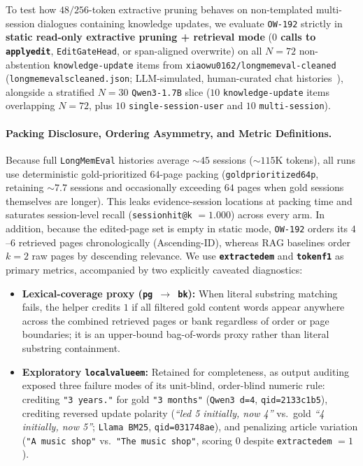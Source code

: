 \documentclass[11pt]{article}
\renewcommand{\_}{\origunderscore\allowbreak}
\begin{document}
To test how $48/256$-token extractive pruning behaves on non-templated multi-session dialogues containing knowledge updates, we evaluate \texttt{OW-192} strictly in \textbf{static read-only extractive pruning + retrieval mode} (\textbf{$0$ calls to \texttt{apply\_edit}}, \texttt{EditGateHead}, or span-aligned overwrite) on all $N=72$ non-abstention \texttt{knowledge-update} items from \texttt{xiaowu0162/\allowbreak longmemeval-cleaned} (\texttt{longmemeval\_s\_cleaned.json}; LLM-simulated, human-curated chat histories~\cite{wu2025longmemeval}), alongside a stratified $N=30$ \texttt{Qwen3-1.7B} slice ($10$ \texttt{knowledge-update} items overlapping $N=72$, plus $10$ \texttt{single-session-user} and $10$ \texttt{multi-session}).

\paragraph{Packing Disclosure, Ordering Asymmetry, and Metric Definitions.}
Because full \texttt{LongMemEval} histories average $\sim 45$ sessions ($\sim 115\text{K}$ tokens), all runs use deterministic gold-prioritized $64$-page packing (\texttt{gold\_prioritized\_64p}, retaining $\sim 7.7$ sessions and occasionally exceeding $64$ pages when gold sessions themselves are longer). This leaks evidence-session locations at packing time and saturates session-level recall (\texttt{session\_hit@k} $=1.000$) across every arm. In addition, because the edited-page set is empty in static mode, \texttt{OW-192} orders its $4$--$6$ retrieved pages chronologically (Ascending-ID), whereas RAG baselines order $k=2$ raw pages by descending relevance. We use \textbf{\texttt{extracted\_em}} and \textbf{\texttt{token\_f1}} as primary metrics, accompanied by two explicitly caveated diagnostics:
\begin{itemize}
    \item \textbf{Lexical-coverage proxy (\texttt{pg $\rightarrow$ bk}):} When literal substring matching fails, the helper credits $1$ if all filtered gold content words appear anywhere across the combined retrieved pages or bank regardless of order or page boundaries; it is an upper-bound bag-of-words proxy rather than literal substring containment.
    \item \textbf{Exploratory \texttt{local\_value\_em}:} Retained for completeness, as output auditing exposed three failure modes of its unit-blind, order-blind numeric rule: crediting \texttt{"3 years."} for gold \texttt{"3 months"} (\texttt{Qwen3 d=4}, \texttt{qid=2133c1b5}), crediting reversed update polarity (\emph{``led 5 initially, now 4''} vs.\ gold \emph{``4 initially, now 5''}; \texttt{Llama BM25}, \texttt{qid=031748ae}), and penalizing article variation (\texttt{"A music shop"} vs.\ \texttt{"The music shop"}, scoring $0$ despite \texttt{extracted\_em} $=1$).
\end{itemize}
\end{document}
